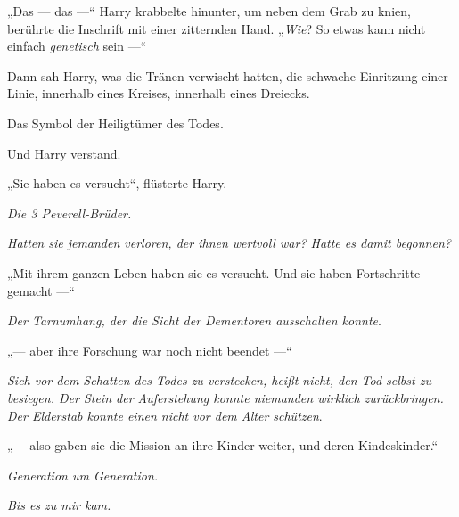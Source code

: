 „Das — das —“ Harry krabbelte hinunter, um neben dem Grab zu knien, berührte die Inschrift mit einer zitternden Hand.
„\emph{Wie}? So etwas kann nicht einfach \emph{genetisch} sein —“

Dann sah Harry, was die Tränen verwischt hatten, die schwache Einritzung einer Linie, innerhalb eines Kreises, innerhalb eines Dreiecks.

Das Symbol der Heiligtümer des Todes.

Und Harry verstand.

„Sie haben es versucht“, flüsterte Harry.

\emph{Die 3 Peverell-Brüder.}

\emph{Hatten sie jemanden verloren, der ihnen wertvoll war? Hatte es damit begonnen?}

„Mit ihrem ganzen Leben haben sie es versucht. Und sie haben Fortschritte gemacht —“

\emph{Der Tarnumhang, der die Sicht der Dementoren ausschalten konnte}.

 „— aber ihre Forschung war noch nicht beendet —“

\emph{Sich vor dem Schatten des Todes zu verstecken, heißt nicht, den Tod selbst zu besiegen. Der Stein der Auferstehung konnte niemanden wirklich zurückbringen. Der Elderstab konnte einen nicht vor dem Alter schützen}.

„— also gaben sie die Mission an ihre Kinder weiter, und deren Kindeskinder.“

\emph{Generation um Generation.}

\emph{Bis es zu mir kam.}

